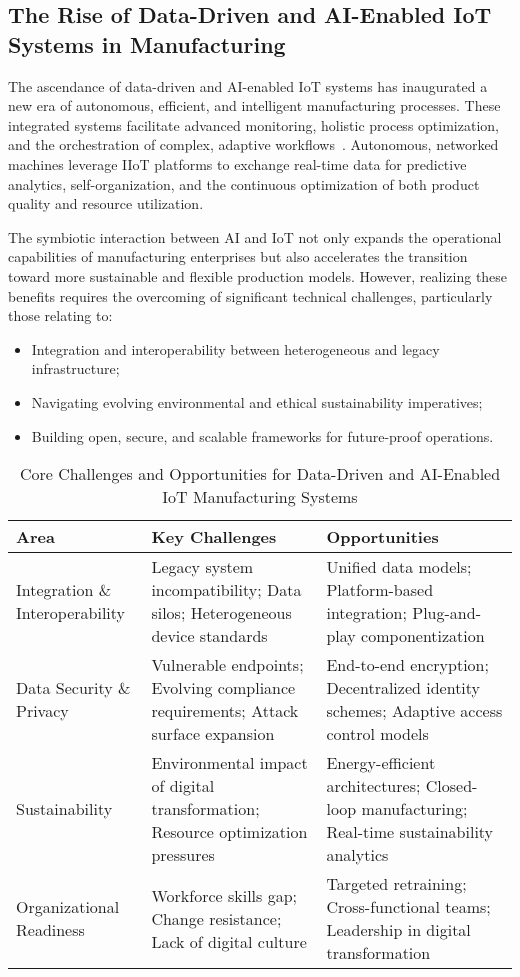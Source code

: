 \documentclass[11pt]{article}
\begin{document}
\subsection{The Rise of Data-Driven and AI-Enabled IoT Systems in Manufacturing}

The ascendance of data-driven and AI-enabled IoT systems has inaugurated a new era of autonomous, efficient, and intelligent manufacturing processes. These integrated systems facilitate advanced monitoring, holistic process optimization, and the orchestration of complex, adaptive workflows~\cite{ref31}. Autonomous, networked machines leverage IIoT platforms to exchange real-time data for predictive analytics, self-organization, and the continuous optimization of both product quality and resource utilization.

The symbiotic interaction between AI and IoT not only expands the operational capabilities of manufacturing enterprises but also accelerates the transition toward more sustainable and flexible production models. However, realizing these benefits requires the overcoming of significant technical challenges, particularly those relating to:
\begin{itemize}
    \item Integration and interoperability between heterogeneous and legacy infrastructure;
    \item Navigating evolving environmental and ethical sustainability imperatives;
    \item Building open, secure, and scalable frameworks for future-proof operations.
\end{itemize}

\begin{table}[ht]
    \centering
    \caption{Core Challenges and Opportunities for Data-Driven and AI-Enabled IoT Manufacturing Systems}
    \label{tab:ai_iot_challenges}
    \begin{tabular}{|p{4cm}|p{5cm}|p{5cm}|}
        \hline
        \textbf{Area} & \textbf{Key Challenges} & \textbf{Opportunities} \\
        \hline
        Integration \& Interoperability & Legacy system incompatibility; Data silos; Heterogeneous device standards & Unified data models; Platform-based integration; Plug-and-play componentization \\
        \hline
        Data Security \& Privacy & Vulnerable endpoints; Evolving compliance requirements; Attack surface expansion & End-to-end encryption; Decentralized identity schemes; Adaptive access control models \\
        \hline
        Sustainability & Environmental impact of digital transformation; Resource optimization pressures & Energy-efficient architectures; Closed-loop manufacturing; Real-time sustainability analytics \\
        \hline
        Organizational Readiness & Workforce skills gap; Change resistance; Lack of digital culture & Targeted retraining; Cross-functional teams; Leadership in digital transformation \\
        \hline
    \end{tabular}
\end{table}
\end{document}
